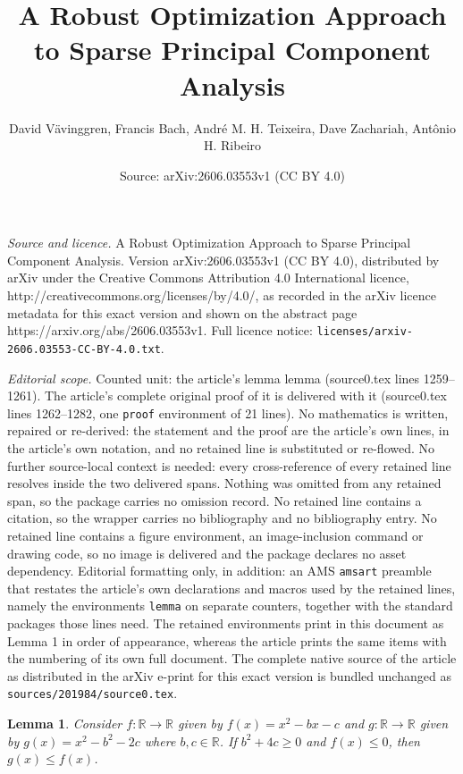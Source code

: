 \documentclass[10pt,a4paper]{amsart}
\title{A Robust Optimization Approach to Sparse Principal Component Analysis}
\author{David V\"avinggren, Francis Bach, Andr\'e M. H. Teixeira, Dave Zachariah, Ant\^onio H. Ribeiro}
\date{Source: arXiv:2606.03553v1 (CC BY 4.0)}
\newtheorem{lemma}{Lemma}
\begin{document}
\maketitle

\noindent\emph{Source and licence.} A Robust Optimization Approach to Sparse Principal Component Analysis. Version arXiv:2606.03553v1 (CC BY 4.0), distributed by arXiv under the Creative Commons Attribution 4.0 International licence, http://creativecommons.org/licenses/by/4.0/, as recorded in the arXiv licence metadata for this exact version and shown on the abstract page https://arxiv.org/abs/2606.03553v1. Full licence notice: \texttt{licenses/arxiv-2606.03553-CC-BY-4.0.txt}.\par\smallskip

\noindent\textit{Editorial scope.} Counted unit: the article's lemma lemma (source0.tex lines 1259--1261). The article's complete original proof of it is delivered with it (source0.tex lines 1262--1282, one \texttt{proof} environment of 21 lines). No mathematics is written, repaired or re-derived: the statement and the proof are the article's own lines, in the article's own notation, and no retained line is substituted or re-flowed.  No further source-local context is needed: every cross-reference of every retained line resolves inside the two delivered spans.  Nothing was omitted from any retained span, so the package carries no omission record.  No retained line contains a citation, so the wrapper carries no bibliography and no bibliography entry.  No retained line contains a figure environment, an image-inclusion command or drawing code, so no image is delivered and the package declares no asset dependency.  Editorial formatting only, in addition: an AMS \texttt{amsart} preamble that restates the article's own declarations and macros used by the retained lines, namely the environments \texttt{lemma} on separate counters, together with the standard packages those lines need.  The retained environments print in this document as Lemma 1 in order of appearance, whereas the article prints the same items with the numbering of its own full document.  The complete native source of the article as distributed in the arXiv e-print for this exact version is bundled unchanged as \texttt{sources/201984/source0.tex}.
\begin{lemma}
    Consider $f: \mathbb{R} \to \mathbb{R}$ given by $f(x) = x^2 - bx - c$ and $g: \mathbb{R} \to \mathbb{R}$ given by $g(x) = x^2 - b^2 - 2c$ where $b,c \in \mathbb{R}$. If $b^2 + 4c \geq 0$ and $f(x) \leq 0$, then $g(x) \leq f(x)$.
\end{lemma}
\end{document}
